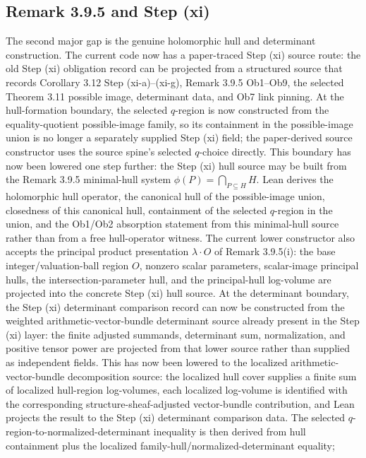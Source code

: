 \documentclass[11pt]{article}
\theoremstyle{plain}
\theoremstyle{definition}
\theoremstyle{remark}
\begin{document}
\subsection{Remark 3.9.5 and Step (xi)}

The second major gap is the genuine holomorphic hull and determinant
construction.  The current code now has a paper-traced Step (xi) source route:
the old Step (xi) obligation record can be projected from a structured source
that records Corollary 3.12 Step (xi-a)--(xi-g), Remark 3.9.5 Ob1--Ob9, the
selected Theorem 3.11 possible image, determinant data, and Ob7 link pinning.
At the hull-formation boundary, the selected \(q\)-region is now constructed
from the equality-quotient possible-image family, so its containment in the
possible-image union is no longer a separately supplied Step (xi) field; the
paper-derived source constructor uses the source spine's selected \(q\)-choice
directly.  This boundary has now been lowered one step further: the Step (xi)
hull source may be built from the Remark 3.9.5 minimal-hull system
\(\phi(P)=\bigcap_{P\subseteq H}H\).  Lean derives the holomorphic hull
operator, the canonical hull of the possible-image union, closedness of this
canonical hull, containment of the selected \(q\)-region in the union, and the
Ob1/Ob2 absorption statement from this minimal-hull source rather than from a
free hull-operator witness.  The current lower constructor also accepts the
principal product presentation \(\lambda\cdot O\) of Remark 3.9.5(i): the base
integer/valuation-ball region \(O\), nonzero scalar parameters, scalar-image
principal hulls, the intersection-parameter hull, and the principal-hull
log-volume are projected into the concrete Step (xi) hull source.
At the determinant boundary, the Step (xi) determinant comparison record can
now be constructed from the weighted arithmetic-vector-bundle determinant
source already present in the Step (xi) layer: the finite adjusted summands,
determinant sum, normalization, and positive tensor power are projected from
that lower source rather than supplied as independent fields.  This has now
been lowered to the localized arithmetic-vector-bundle decomposition source:
the localized hull cover supplies a finite sum of localized hull-region
log-volumes, each localized log-volume is identified with the corresponding
structure-sheaf-adjusted vector-bundle contribution, and Lean projects the
result to the Step (xi) determinant comparison data.  The selected
\(q\)-region-to-normalized-determinant inequality is then derived from hull
containment plus the localized family-hull/normalized-determinant equality;
\end{document}

